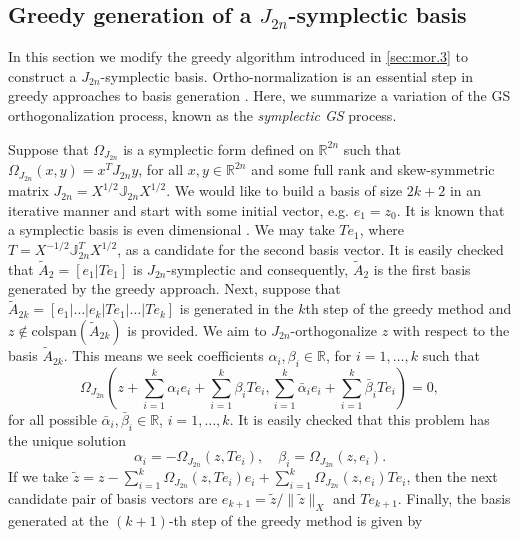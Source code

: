 \subsection{Greedy generation of a $J_{2n}$-symplectic basis} \label{sec:normmor.2}
In this section we modify the greedy algorithm introduced in \cref{sec:mor.3} to construct a $J_{2n}$-symplectic basis. Ortho-normalization is an essential step in greedy approaches to basis generation \cite{hesthaven2015certified,quarteroni2015reduced}. Here, we summarize a variation of the GS orthogonalization process, known as the \emph{symplectic GS} process.

Suppose that $\Omega_{J_{2n}}$ is a symplectic form defined on $\mathbb R^{2n}$ such that $\Omega_{J_{2n}}(x,y) = x^T J_{2n} y$, for all $x,y\in \mathbb R^{2n}$ and some full rank and skew-symmetric matrix $J_{2n} = X^{1/2} \mathbb J_{2n} X^{1/2}$. We would like to build a basis of size $2k+2$ in an iterative manner and start with some initial vector, e.g. $e_1 = z_0$. It is known that a symplectic basis is even dimensional \cite{Marsden:2010:IMS:1965128}. We may take $Te_1$, where $T = X^{-1/2} \mathbb J_{2n}^{T}X^{1/2}$, as a candidate for the second basis vector. It is easily checked that $\tilde A_2=[e_1|Te_1]$ is $J_{2n}$-symplectic and consequently, $\tilde A_2$ is the first basis generated by the greedy approach. Next, suppose that $\tilde A_{2k} = [e_1|\dots|e_k|Te_1|\dots|Te_k]$ is generated in the $k$th step of the greedy method and $z\not \in \text{colspan}\left(\tilde A_{2k}\right)$ is provided. We aim to $J_{2n}$-orthogonalize $z$ with respect to the basis $\tilde A_{2k}$. This means we seek coefficients $\alpha_i,\beta_i\in \mathbb R$, for $i=1,\dots,k$ such that
\begin{equation} \label{eq:normmor.9}
	\Omega_{J_{2n}}\left( z +\sum_{i=1}^{k} \alpha_i e_i +\sum_{i=1}^{k} \beta_i Te_i, \sum_{i=1}^{k}\bar \alpha_i e_i +\sum_{i=1}^{k} \bar \beta_i Te_i \right) = 0,
\end{equation}
for all possible $\bar \alpha_i,\bar \beta_i \in \mathbb R$, $i=1,\dots,k$. It is easily checked that this problem has the unique solution
\begin{equation} \label{eq:normmor.10}
	\alpha_i = - \Omega_{J_{2n}}(z,Te_i), \quad \beta_i = \Omega_{J_{2n}}(z,e_i).
\end{equation}
If we take $\tilde z = z -\sum_{i=1}^{k} \Omega_{J_{2n}}(z,Te_i) e_i +\sum_{i=1}^{k} \Omega_{J_{2n}}(z,e_i) Te_i$, then the next candidate pair of basis vectors are $e_{k+1} = \tilde z / \| \tilde z \|_X$ and $Te_{k+1}$. Finally, the basis generated at the $(k+1)$-th step of the greedy method is given by
